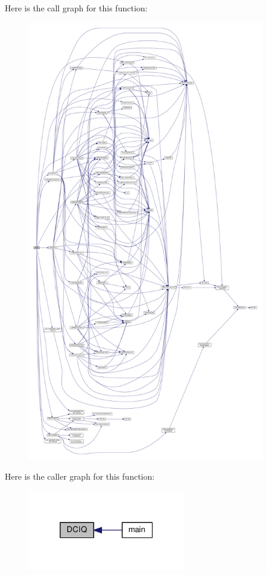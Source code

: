 Here is the call graph for this function\+:
\nopagebreak
\begin{figure}[H]
\begin{center}
\leavevmode
\includegraphics[height=550pt]{dd/d0b/mcu__program_2host__src_2main_8cpp_a2bb1d2fcd6182ef32aff315f85d13c53_cgraph}
\end{center}
\end{figure}




Here is the caller graph for this function\+:
\nopagebreak
\begin{figure}[H]
\begin{center}
\leavevmode
\includegraphics[width=196pt]{dd/d0b/mcu__program_2host__src_2main_8cpp_a2bb1d2fcd6182ef32aff315f85d13c53_icgraph}
\end{center}
\end{figure}


